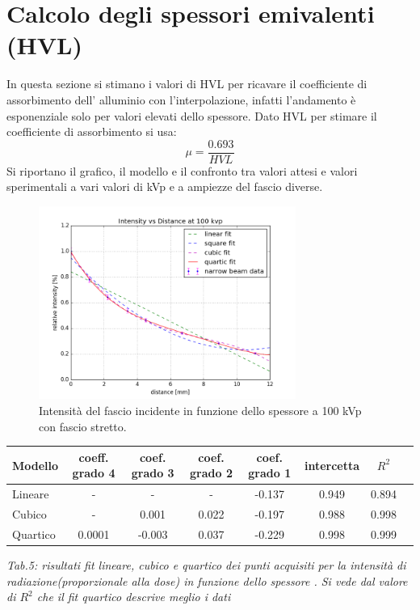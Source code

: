 \documentclass[a4paper]{article}
\begin{document}
\section{Calcolo degli spessori emivalenti (HVL)}
In questa sezione si stimano i valori di HVL per ricavare il coefficiente di assorbimento dell' alluminio con l'interpolazione, infatti l'andamento è esponenziale solo per valori elevati dello spessore. Dato HVL per stimare il coefficiente di assorbimento si usa: \begin{equation}
\mu =\frac{0.693}{HVL}
\end{equation} 
Si riportano il grafico, il modello e il confronto tra valori attesi e valori sperimentali a vari valori di kVp e a ampiezze del fascio diverse.  
\begin{figure}[H]
\centering
\includegraphics[width=0.75\textwidth]{hvl100pvk.png}
\caption{Intensità del fascio incidente in funzione dello spessore a 100 kVp con fascio stretto.}
\end{figure}

\begin{center} 
		
		\begin{tabular}{lccccccc}
			\hline
			\hline
			\textbf{Modello}	& \textbf{coeff. grado 4}&\textbf{coef. grado 3}&\textbf{coef. grado 2}& \textbf{coef. grado 1}& \textbf{intercetta}&  \textbf{$R^{2}$} 	 \\
			\hline
			\hline
			Lineare	&-&-&-&-0.137&0.949&0.894	\\
			Cubico	&-&0.001&0.022&-0.197&0.988&0.998\\
			Quartico &0.0001&-0.003&0.037&-0.229&0.998&0.999\\
			
			\hline
			\hline
		\end{tabular}
		\linebreak
		\emph{Tab.5: risultati fit lineare, cubico e quartico  dei punti acquisiti per la intensità di radiazione(proporzionale alla dose) in funzione dello spessore . Si vede dal valore di $R^{2}$ che il fit quartico descrive meglio i dati} 
	\end{center} 
\end{document}
